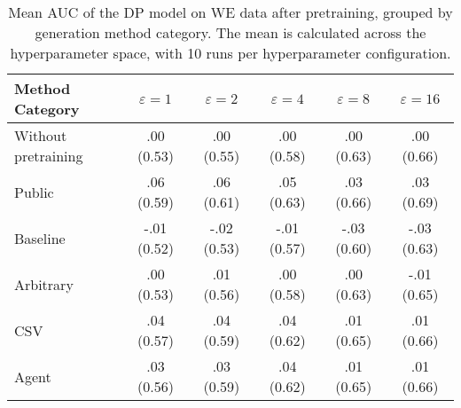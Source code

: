 \begin{table}[h!]
    \centering
    \caption{Mean AUC of the DP model on WE data after pretraining, grouped by generation method category. The mean is calculated across the hyperparameter space, with 10 runs per hyperparameter configuration.}
    \label{tab:epsilon_comparison}
    \begin{tabular}{lccccc}
    \toprule
    Method Category & $\varepsilon=1$ & $\varepsilon=2$ & $\varepsilon=4$ & $\varepsilon=8$ & $\varepsilon=16$ \\
    \midrule
    Without pretraining & .00 {\small (0.53)} & .00 {\small (0.55)} & .00 {\small (0.58)} & .00 {\small (0.63)} & .00 {\small (0.66)} \\
    \arrayrulecolor{black!50!}\midrule
    Public & \cellcolor{gold!30}.06 {\small (0.59)} & \cellcolor{gold!30}.06 {\small (0.61)} & \cellcolor{gold!30}.05 {\small (0.63)} & \cellcolor{gold!30}.03 {\small (0.66)} & \cellcolor{gold!30}.03 {\small (0.69)} \\
    \arrayrulecolor{black!50!}\midrule
    Baseline & -.01 {\small (0.52)} & -.02 {\small (0.53)} & -.01 {\small (0.57)} & -.03 {\small (0.60)} & -.03 {\small (0.63)} \\
    \arrayrulecolor{black!50!}\midrule
    Arbitrary & .00 {\small (0.53)} & .01 {\small (0.56)} & .00 {\small (0.58)} & .00 {\small (0.63)} & \cellcolor{bronze!30}-.01 {\small (0.65)} \\
    \arrayrulecolor{black!50!}\midrule
    CSV & \cellcolor{silver!30}.04 {\small (0.57)} & \cellcolor{silver!30}.04 {\small (0.59)} & \cellcolor{silver!30}.04 {\small (0.62)} & \cellcolor{bronze!30}.01 {\small (0.65)} & \cellcolor{silver!30}.01 {\small (0.66)} \\
    Agent & \cellcolor{bronze!30}.03 {\small (0.56)} & \cellcolor{bronze!30}.03 {\small (0.59)} & \cellcolor{bronze!30}.04 {\small (0.62)} & \cellcolor{silver!30}.01 {\small (0.65)} & \cellcolor{silver!30}.01 {\small (0.66)} \\
    \bottomrule
    \end{tabular}
\end{table}